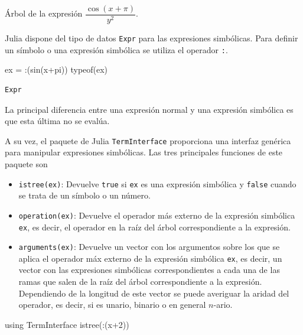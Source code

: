 \documentclass[
  a4paper,
]{scrreport}
\newenvironment{Shaded}{\begin{snugshade}}{\end{snugshade}}
\newcommand{\BuiltInTok}[1]{\textcolor[rgb]{0.00,0.23,0.31}{#1}}
\newcommand{\ConstantTok}[1]{\textcolor[rgb]{0.56,0.35,0.01}{#1}}
\newcommand{\FloatTok}[1]{\textcolor[rgb]{0.68,0.00,0.00}{#1}}
\newcommand{\FunctionTok}[1]{\textcolor[rgb]{0.28,0.35,0.67}{#1}}
\newcommand{\ImportTok}[1]{\textcolor[rgb]{0.00,0.46,0.62}{#1}}
\newcommand{\NormalTok}[1]{\textcolor[rgb]{0.00,0.23,0.31}{#1}}
\newcommand{\OperatorTok}[1]{\textcolor[rgb]{0.37,0.37,0.37}{#1}}
\providecommand{\tightlist}{%
  \setlength{\itemsep}{0pt}\setlength{\parskip}{0pt}}\usepackage{longtable,booktabs,array}
\begin{document}
Árbol de la expresión \(\dfrac{\cos(x+\pi)}{y^2}\).

Julia dispone del tipo de datos \texttt{Expr} para las expresiones
simbólicas. Para definir un símbolo o una expresión simbólica se utiliza
el operador \texttt{:}.

\begin{Shaded}
\begin{Highlighting}[]
\NormalTok{ex }\OperatorTok{=} \OperatorTok{:}\NormalTok{(}\FunctionTok{sin}\NormalTok{(x}\OperatorTok{+}\ConstantTok{pi}\NormalTok{))}
\FunctionTok{typeof}\NormalTok{(ex)}
\end{Highlighting}
\end{Shaded}

\begin{verbatim}
Expr
\end{verbatim}

La principal diferencia entre una expresión normal y una expresión
simbólica es que esta última no se evalúa.

A su vez, el paquete de Julia \texttt{TermInterface} proporciona una
interfaz genérica para manipular expresiones simbólicas. Las tres
principales funciones de este paquete son

\begin{itemize}
\tightlist
\item
  \texttt{istree(ex)}: Devuelve \texttt{true} si \texttt{ex} es una
  expresión simbólica y \texttt{false} cuando se trata de un símbolo o
  un número.
\item
  \texttt{operation(ex)}: Devuelve el operador más externo de la
  expresión simbólica \texttt{ex}, es decir, el operador en la raíz del
  árbol correspondiente a la expresión.
\item
  \texttt{arguments(ex)}: Devuelve un vector con los argumentos sobre
  los que se aplica el operador máx externo de la expresión simbólica
  \texttt{ex}, es decir, un vector con las expresiones simbólicas
  correspondientes a cada una de las ramas que salen de la raíz del
  árbol correspondiente a la expresión. Dependiendo de la longitud de
  este vector se puede averiguar la aridad del operador, es decir, si es
  unario, binario o en general \(n\)-ario.
\end{itemize}

\begin{Shaded}
\begin{Highlighting}[]
\ImportTok{using} \BuiltInTok{TermInterface}
\FunctionTok{istree}\NormalTok{(}\OperatorTok{:}\NormalTok{(x}\OperatorTok{+}\FloatTok{2}\NormalTok{))}
\end{Highlighting}
\end{Shaded}
\end{document}
